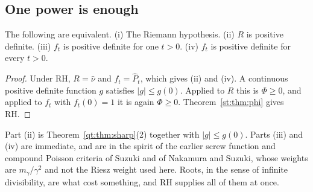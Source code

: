 \subsection{One power is enough}
\begin{theorem}\label{st:thm:pd}
The following are equivalent. (i) The Riemann hypothesis. (ii) $R$ is positive definite. (iii) $f_t$ is positive definite for one $t>0$. (iv) $f_t$ is positive definite for every $t>0$.
\end{theorem}
\begin{proof}
Under RH, $R=\hat\nu$ and $f_t=\hat P_t$, which gives (ii) and (iv). A continuous positive definite function $g$ satisfies $|g|\le g(0)$. Applied to $R$ this is $\Phi\ge0$, and applied to $f_t$ with $f_t(0)=1$ it is again $\Phi\ge0$. Theorem~\ref{st:thm:phi} gives RH.
\end{proof}
Part (ii) is Theorem~\ref{qt:thm:sharp}(2) together with $|g|\le g(0)$. Parts (iii) and (iv) are immediate, and are in the spirit of the earlier screw function and compound Poisson criteria of Suzuki and of Nakamura and Suzuki, whose weights are $m_\gamma/\gamma^2$ and not the Riesz weight used here. Roots, in the sense of infinite divisibility, are what cost something, and RH supplies all of them at once.

